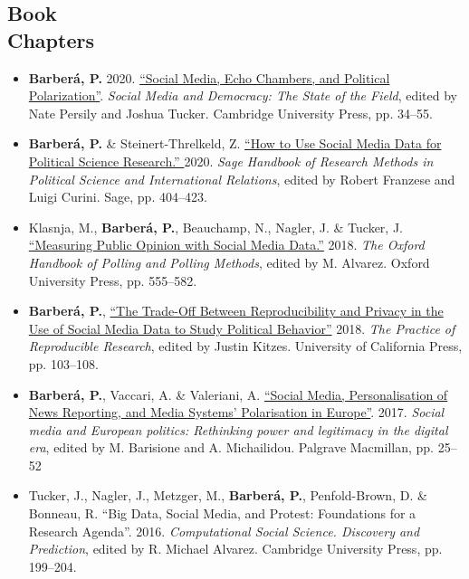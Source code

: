 \documentclass[margin,line,11pt]{resume}
\begin{document}
\begin{resume}
\section{\mysidestyle Book\\Chapters} 
\vspace{.15cm}    
\begin{itemize}[leftmargin=5.5mm]
\item[6.] \textbf{Barber\'{a}, P.} 2020. \href{http://www.pablobarbera.com/static/echo-chambers.pdf}{``Social Media, Echo Chambers, and Political Polarization''}. \textit{Social Media and Democracy: The State of the Field}, edited by Nate Persily and Joshua Tucker. Cambridge University Press, pp. 34--55.

\item[5.] \textbf{Barber\'{a}, P.} \& Steinert-Threlkeld, Z. \href{http://www.pablobarbera.com/static/social-media-data-generators.pdf}{``How to Use Social Media Data for Political Science Research.'' } 2020. \textit{Sage Handbook of Research Methods in Political Science and International Relations}, edited by Robert Franzese and Luigi Curini. Sage, pp. 404--423.

\item[4.] Klasnja, M., \textbf{Barber\'{a}, P.}, Beauchamp, N., Nagler, J. \& Tucker, J. \href{http://www.oxfordhandbooks.com/view/10.1093/oxfordhb/9780190213299.001.0001/oxfordhb-9780190213299-e-3}{``Measuring Public Opinion with Social Media Data.''} 2018. \textit{The Oxford Handbook of Polling and Polling Methods}, edited by M. Alvarez. Oxford University Press, pp. 555--582.

\item[3.] \textbf{Barber\'{a}, P.}, \href{https://www.practicereproducibleresearch.org/case-studies/barbera.html}{``The Trade-Off Between Reproducibility and Privacy in the Use of Social Media Data to Study Political Behavior''} 2018. \textit{The Practice of Reproducible Research}, edited by Justin Kitzes. University of California Press, pp. 103--108. 


\item[2.] \textbf{Barber\'{a}, P.}, Vaccari, A. \& Valeriani, A. \href{https://link.springer.com/chapter/10.1057/978-1-137-59890-5_2}{``Social Media, Personalisation of News Reporting, and Media Systems' Polarisation in Europe''}. 2017. \textit{Social media and European politics: Rethinking power and legitimacy in the digital era}, edited by M. Barisione and A. Michailidou. Palgrave Macmillan, pp. 25--52

\item[1.] Tucker, J., Nagler, J., Metzger, M., \textbf{Barber\'{a}, P.}, Penfold-Brown, D. \& Bonneau, R. ``Big Data, Social Media, and Protest: Foundations for a Research Agenda''. 2016. \textit{Computational Social Science. Discovery and Prediction}, edited by R. Michael Alvarez. Cambridge University Press, pp. 199--204.
\end{itemize}



\end{resume}
\end{document}
